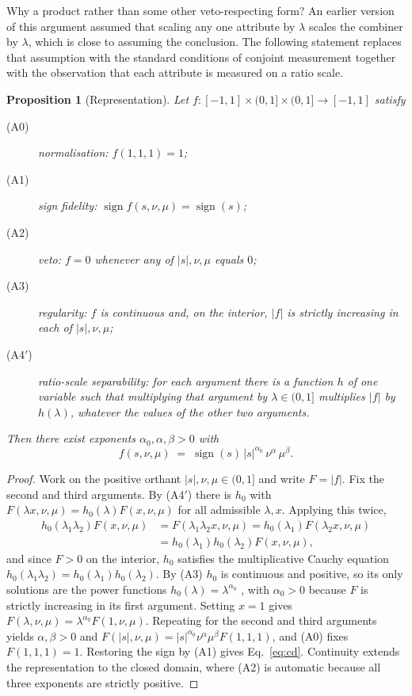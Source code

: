 \documentclass[preprint,12pt,authoryear]{elsarticle}
\theoremstyle{plain}
\newtheorem{proposition}{Proposition}
\theoremstyle{remark}
\begin{document}
Why a product rather than some other veto-respecting form? An earlier version of
this argument assumed that scaling any one attribute by $\lambda$ scales the
combiner by $\lambda$, which is close to assuming the conclusion. The following
statement replaces that assumption with the standard conditions of conjoint
measurement \citep{debreu1960,gorman1968,krantz1971} together with the
observation that each attribute is measured on a ratio scale.

\begin{proposition}[Representation]\label{prop:rep}
Let $f:[-1,1]\times(0,1]\times(0,1]\to[-1,1]$ satisfy
\begin{description}
\item[(A0)] \emph{normalisation}: $f(1,1,1)=1$;
\item[(A1)] \emph{sign fidelity}:
  $\operatorname{sign}f(s,\nu,\mu)=\operatorname{sign}(s)$;
\item[(A2)] \emph{veto}: $f=0$ whenever any of $|s|,\nu,\mu$ equals $0$;
\item[(A3)] \emph{regularity}: $f$ is continuous and, on the interior, $|f|$ is
  strictly increasing in each of $|s|,\nu,\mu$;
\item[(A4$'$)] \emph{ratio-scale separability}: for each argument there is a
  function $h$ of one variable such that multiplying that argument by
  $\lambda\in(0,1]$ multiplies $|f|$ by $h(\lambda)$, whatever the values of the
  other two arguments.
\end{description}
Then there exist exponents $\alpha_0,\alpha,\beta>0$ with
\begin{equation}\label{eq:cd}
f(s,\nu,\mu)\;=\;\operatorname{sign}(s)\,|s|^{\alpha_0}\,\nu^{\alpha}\,\mu^{\beta}.
\end{equation}
\end{proposition}

\begin{proof}
Work on the positive orthant $|s|,\nu,\mu\in(0,1]$ and write $F=|f|$. Fix the
second and third arguments. By (A4$'$) there is $h_0$ with
$F(\lambda x,\nu,\mu)=h_0(\lambda)F(x,\nu,\mu)$ for all admissible $\lambda,x$.
Applying this twice,
\begin{align*}
h_0(\lambda_1\lambda_2)F(x,\nu,\mu)
 &=F(\lambda_1\lambda_2 x,\nu,\mu)=h_0(\lambda_1)F(\lambda_2x,\nu,\mu)\\
 &=h_0(\lambda_1)h_0(\lambda_2)F(x,\nu,\mu),
\end{align*}
and since $F>0$ on the interior, $h_0$ satisfies the multiplicative Cauchy
equation $h_0(\lambda_1\lambda_2)=h_0(\lambda_1)h_0(\lambda_2)$. By (A3) $h_0$
is continuous and positive, so its only solutions are the power functions
$h_0(\lambda)=\lambda^{\alpha_0}$ \citep{aczel1966}, with $\alpha_0>0$ because
$F$ is strictly increasing in its first argument. Setting $x=1$ gives
$F(\lambda,\nu,\mu)=\lambda^{\alpha_0}F(1,\nu,\mu)$. Repeating for the second
and third arguments yields $\alpha,\beta>0$ and
$F(|s|,\nu,\mu)=|s|^{\alpha_0}\nu^{\alpha}\mu^{\beta}F(1,1,1)$, and (A0) fixes
$F(1,1,1)=1$. Restoring the sign by (A1) gives Eq.~\eqref{eq:cd}. Continuity
extends the representation to the closed domain, where (A2) is automatic because
all three exponents are strictly positive.
\end{proof}
\end{document}
